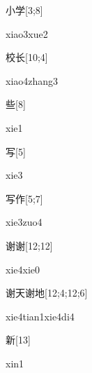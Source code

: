 \begin{verbete}{小学}[3;8]
\begin{pronuncia}{xiao3xue2}
\end{pronuncia}
\end{verbete}

\begin{verbete}{校长}[10;4]
\begin{pronuncia}{xiao4zhang3}
\end{pronuncia}
\end{verbete}

\begin{verbete}[xie1]{些}[8]
\begin{pronuncia}{xie1}
\end{pronuncia}
\end{verbete}

\begin{verbete}[xie3]{写}[5]
\begin{pronuncia}{xie3}
\end{pronuncia}
\end{verbete}

\begin{verbete}{写作}[5;7]
\begin{pronuncia}{xie3zuo4}
\end{pronuncia}
\end{verbete}

\begin{verbete}{谢谢}[12;12]
\begin{pronuncia}{xie4xie0}
\end{pronuncia}
\end{verbete}

\begin{verbete}{谢天谢地}[12;4;12;6]
\begin{pronuncia}[\\]{xie4tian1xie4di4}
\end{pronuncia}
\end{verbete}

\begin{verbete}[xin1]{新}[13]
\begin{pronuncia}{xin1}
\end{pronuncia}
\end{verbete}

